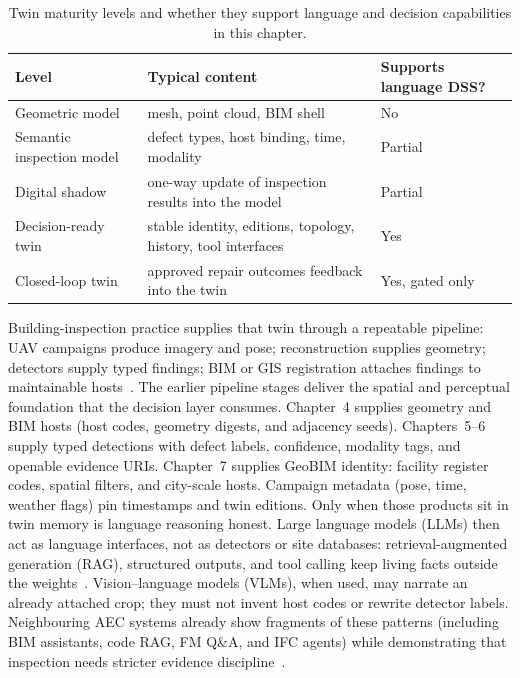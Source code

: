 \begin{table}[htbp]
\centering
\caption{Twin maturity levels and whether they support language and decision capabilities in this chapter.}
\label{tab:ch8-twin-maturity}
\begin{tabular}{llp{4.6cm}}
\toprule
Level & Typical content & Supports language DSS? \\
\midrule
Geometric model & mesh, point cloud, BIM shell & No \\
Semantic inspection model & defect types, host binding, time, modality & Partial \\
Digital shadow & one-way update of inspection results into the model & Partial \\
Decision-ready twin & stable identity, editions, topology, history, tool interfaces & Yes \\
Closed-loop twin & approved repair outcomes feedback into the twin & Yes, gated only \\
\bottomrule
\end{tabular}
\end{table}

Building-inspection practice supplies that twin through a repeatable pipeline: UAV campaigns produce imagery and pose; reconstruction supplies geometry; detectors supply typed findings; BIM or GIS registration attaches findings to maintainable hosts~\cite{zhang2022,zhang2025,yang2025detreconreg,zhao2024facade,zhao2026physical}. The earlier pipeline stages deliver the spatial and perceptual foundation that the decision layer consumes. Chapter~4 supplies geometry and BIM hosts (host codes, geometry digests, and adjacency seeds). Chapters~5--6 supply typed detections with defect labels, confidence, modality tags, and openable evidence URIs. Chapter~7 supplies GeoBIM identity: facility register codes, spatial filters, and city-scale hosts. Campaign metadata (pose, time, weather flags) pin timestamps and twin editions. Only when those products sit in twin memory is language reasoning honest. Large language models (LLMs) then act as language interfaces, not as detectors or site databases: retrieval-augmented generation (RAG), structured outputs, and tool calling keep living facts outside the weights~\cite{lewis2020,shuster2021,yao2023react,ji2023}. Vision--language models (VLMs), when used, may narrate an already attached crop; they must not invent host codes or rewrite detector labels. Neighbouring AEC systems already show fragments of these patterns (including BIM assistants, code RAG, FM Q\&A, and IFC agents) while demonstrating that inspection needs stricter evidence discipline~\cite{zheng2023bimassistant,joffe2025buildingcodes,krutli2025fmrags,gao2026ifcagent,luo2025llmdtrobot}.

